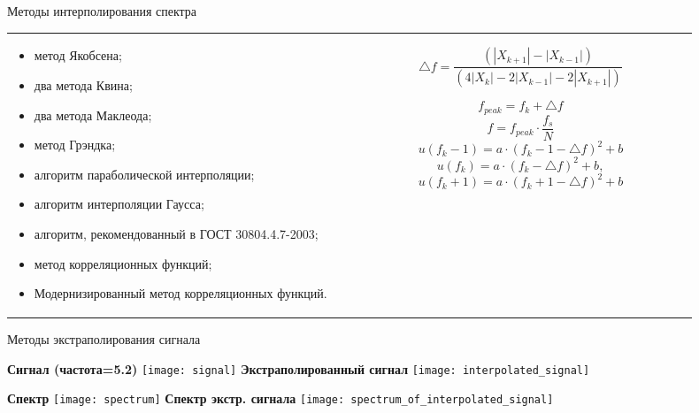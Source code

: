 \begin{frame}{Методы интерполирования спектра}
\begin{tabular}{m{0.45\linewidth}m{0.45\linewidth}}
\begin{itemize}	
	\item метод Якобсена;
	\item два метода Квина;
	\item два метода Маклеода;
	\item метод Грэндка;
	\item алгоритм параболической интерполяции;
	\item алгоритм интерполяции Гаусса;
	\item алгоритм, рекомендованный в ГОСТ 30804.4.7-2003;
	\item метод корреляционных функций;
	\item Модернизированный метод корреляционных функций.				
\end{itemize}
&	
\begin{equation}
	\label{eq:equation2}
	\bigtriangleup f = \frac{(|X_{k+1}|-|X_{k-1}|)}{(4|X_{k}|-2|X_{k-1}|-2|X_{k+1}|)}
\end{equation}

\begin{equation}
	\label{eq:equation7}
	f_{peak} = f_k + \bigtriangleup f
\end{equation}
\begin{equation}
	\label{eq:equation8}
	f=f_{peak} \cdot \frac{f_s}{N}
\end{equation}
\begin{equation}
	\label{eq:equation4}
	u(f_k-1) = a \cdot (f_k-1-\bigtriangleup f)^2 + b
\end{equation}
\begin{equation}
	\label{eq:equation5}
	u(f_k) = a \cdot (f_k-\bigtriangleup f)^2+b,
\end{equation}
\begin{equation}
	\label{eq:equation6}
	u(f_k+1) = a\cdot (f_k+1-\bigtriangleup f)^2 +b
\end{equation}
\end{tabular}
\end{frame}

\begin{frame}{Методы экстраполирования сигнала}
	\begin{minipage}[t]{0.45\linewidth}
		\centering 
		\textbf{Сигнал (частота=5.2)}
		\texttt{[image: signal]}
		\textbf{Экстраполированный сигнал }
		\texttt{[image: interpolated\_signal]}		
	\end{minipage}
	\hfill
	\begin{minipage}[t]{0.45\linewidth}
		\centering 
		\textbf{Спектр}
		\texttt{[image: spectrum]}
		\textbf{Спектр экстр. сигнала}
		\texttt{[image: spectrum\_of\_interpolated\_signal]}
	\end{minipage}
\end{frame}

